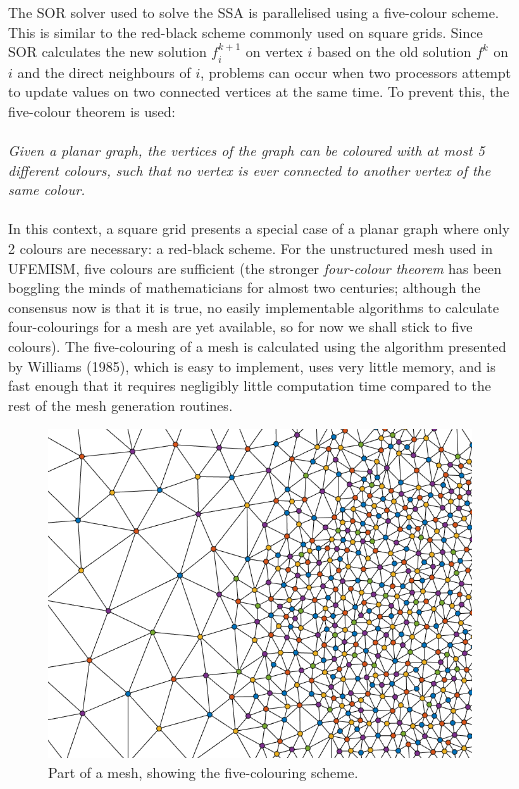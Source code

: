 \documentclass{article}
\begin{document}
The SOR solver used to solve the SSA is parallelised using a five-colour scheme. This is similar to the red-black scheme commonly used on square grids. Since SOR calculates the new solution $f_i^{k+1}$ on vertex $i$ based on the old solution $f^k$ on $i$ and the direct neighbours of $i$, problems can occur when two processors attempt to update values on two connected vertices at the same time. To prevent this, the five-colour theorem is used:\\
\\
\emph{Given a planar graph, the vertices of the graph can be coloured with at most 5 different colours, such that no vertex is ever connected to another vertex of the same colour.}\\
\\
In this context, a square grid presents a special case of a planar graph where only 2 colours are necessary: a red-black scheme. For the unstructured mesh used in UFEMISM, five colours are sufficient (the stronger \textit{four-colour theorem} has been boggling the minds of mathematicians for almost two centuries; although the consensus now is that it is true, no easily implementable algorithms to calculate four-colourings for a mesh are yet available, so for now we shall stick to five colours). The five-colouring of a mesh is calculated using the algorithm presented by Williams (1985), which is easy to implement, uses very little memory, and is fast enough that it requires negligibly little computation time compared to the rest of the mesh generation routines.

\begin{figure}[h!] \label{fig:fivecolours}
  \includegraphics[width=0.8\linewidth]{Fig_fivecolours.png}
  \caption{Part of a mesh, showing the five-colouring scheme.}
\end{figure}
\end{document}
